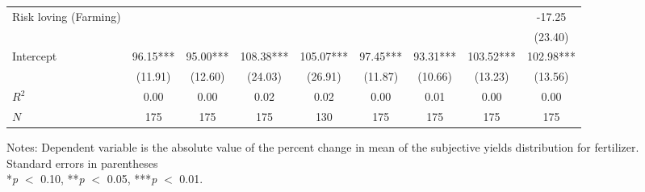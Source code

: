 \begin{table}[htbp]
\begin{threeparttable}
\begin{tabular}{l cccccccc}
Risk loving (Farming)&               &               &               &               &               &               &               &      -17.25   \\
                    &               &               &               &               &               &               &               &     (23.40)   \\
Intercept           &       96.15***&       95.00***&      108.38***&      105.07***&       97.45***&       93.31***&      103.52***&      102.98***\\
                    &     (11.91)   &     (12.60)   &     (24.03)   &     (26.91)   &     (11.87)   &     (10.66)   &     (13.23)   &     (13.56)   \\
\hline
$R^2$               &        0.00   &        0.00   &        0.02   &        0.02   &        0.00   &        0.01   &        0.00   &        0.00   \\
$N$                 &         175   &         175   &         175   &         130   &         175   &         175   &         175   &         175   \\
\hline
\hline
\end{tabular}
\begin{tablenotes}
\footnotesize
\item{Notes: Dependent variable is the absolute value of the percent change in mean of the subjective yields distribution for fertilizer. \\ Standard errors in parentheses \\ *\textit{p} $<$ 0.10, **\textit{p} $<$ 0.05, ***\textit{p} $<$ 0.01.}
\end{tablenotes}
\end{threeparttable}
\end{table}
